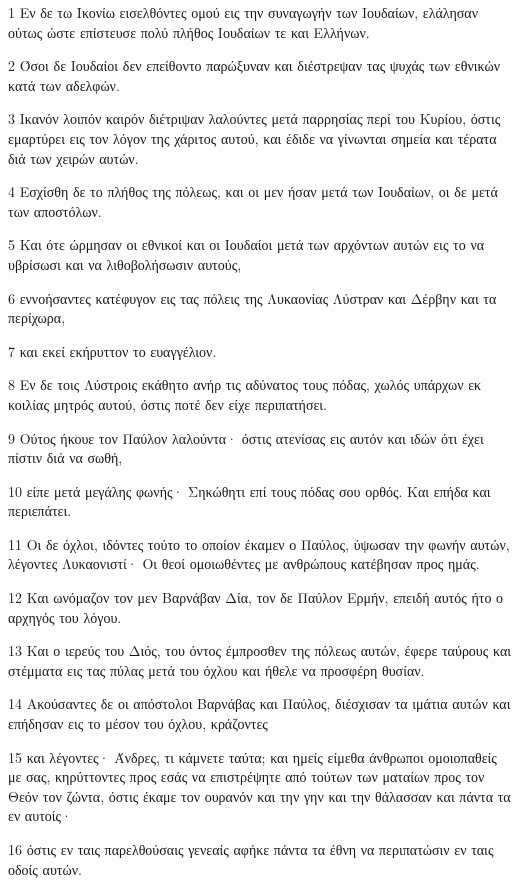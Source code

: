 \par 1 Εν δε τω Ικονίω εισελθόντες ομού εις την συναγωγήν των Ιουδαίων, ελάλησαν ούτως ώστε επίστευσε πολύ πλήθος Ιουδαίων τε και Ελλήνων.
\par 2 Όσοι δε Ιουδαίοι δεν επείθοντο παρώξυναν και διέστρεψαν τας ψυχάς των εθνικών κατά των αδελφών.
\par 3 Ικανόν λοιπόν καιρόν διέτριψαν λαλούντες μετά παρρησίας περί του Κυρίου, όστις εμαρτύρει εις τον λόγον της χάριτος αυτού, και έδιδε να γίνωνται σημεία και τέρατα διά των χειρών αυτών.
\par 4 Εσχίσθη δε το πλήθος της πόλεως, και οι μεν ήσαν μετά των Ιουδαίων, οι δε μετά των αποστόλων.
\par 5 Και ότε ώρμησαν οι εθνικοί και οι Ιουδαίοι μετά των αρχόντων αυτών εις το να υβρίσωσι και να λιθοβολήσωσιν αυτούς,
\par 6 εννοήσαντες κατέφυγον εις τας πόλεις της Λυκαονίας Λύστραν και Δέρβην και τα περίχωρα,
\par 7 και εκεί εκήρυττον το ευαγγέλιον.
\par 8 Εν δε τοις Λύστροις εκάθητο ανήρ τις αδύνατος τους πόδας, χωλός υπάρχων εκ κοιλίας μητρός αυτού, όστις ποτέ δεν είχε περιπατήσει.
\par 9 Ούτος ήκουε τον Παύλον λαλούντα· όστις ατενίσας εις αυτόν και ιδών ότι έχει πίστιν διά να σωθή,
\par 10 είπε μετά μεγάλης φωνής· Σηκώθητι επί τους πόδας σου ορθός. Και επήδα και περιεπάτει.
\par 11 Οι δε όχλοι, ιδόντες τούτο το οποίον έκαμεν ο Παύλος, ύψωσαν την φωνήν αυτών, λέγοντες Λυκαονιστί· Οι θεοί ομοιωθέντες με ανθρώπους κατέβησαν προς ημάς.
\par 12 Και ωνόμαζον τον μεν Βαρνάβαν Δία, τον δε Παύλον Ερμήν, επειδή αυτός ήτο ο αρχηγός του λόγου.
\par 13 Και ο ιερεύς του Διός, του όντος έμπροσθεν της πόλεως αυτών, έφερε ταύρους και στέμματα εις τας πύλας μετά του όχλου και ήθελε να προσφέρη θυσίαν.
\par 14 Ακούσαντες δε οι απόστολοι Βαρνάβας και Παύλος, διέσχισαν τα ιμάτια αυτών και επήδησαν εις το μέσον του όχλου, κράζοντες
\par 15 και λέγοντες· Άνδρες, τι κάμνετε ταύτα; και ημείς είμεθα άνθρωποι ομοιοπαθείς με σας, κηρύττοντες προς εσάς να επιστρέψητε από τούτων των ματαίων προς τον Θεόν τον ζώντα, όστις έκαμε τον ουρανόν και την γην και την θάλασσαν και πάντα τα εν αυτοίς·
\par 16 όστις εν ταις παρελθούσαις γενεαίς αφήκε πάντα τα έθνη να περιπατώσιν εν ταις οδοίς αυτών.

